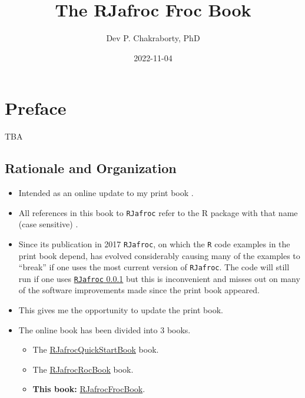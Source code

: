 \documentclass[
]{book}
\title{The RJafroc Froc Book}
\author{Dev P. Chakraborty, PhD}
\date{2022-11-04}
\providecommand{\tightlist}{%
  \setlength{\itemsep}{0pt}\setlength{\parskip}{0pt}}
\begin{document}
\maketitle

{
\setcounter{tocdepth}{1}
\tableofcontents
}
\hypertarget{preface}{%
\chapter*{Preface}\label{preface}}

TBA

\hypertarget{rationale-and-organization}{%
\section{Rationale and Organization}\label{rationale-and-organization}}

\begin{itemize}
\tightlist
\item
  Intended as an online update to my print book \citep{chakraborty2017observer}.
\item
  All references in this book to \texttt{RJafroc} refer to the R package with that name (case sensitive) \citep{R-RJafroc}.
\item
  Since its publication in 2017 \texttt{RJafroc}, on which the \texttt{R} code examples in the print book depend, has evolved considerably causing many of the examples to ``break'' if one uses the most current version of \texttt{RJafroc}. The code will still run if one uses \href{https://cran.r-project.org/src/contrib/Archive/RJafroc/}{\texttt{RJafroc} 0.0.1} but this is inconvenient and misses out on many of the software improvements made since the print book appeared.
\item
  This gives me the opportunity to update the print book.
\item
  The online book has been divided into 3 books.

  \begin{itemize}
  \tightlist
  \item
    The \href{https://dpc10ster.github.io/RJafrocQuickStart/}{RJafrocQuickStartBook} book.
  \item
    The \href{https://dpc10ster.github.io/RJafrocRocBook/}{RJafrocRocBook} book.
  \item
    \textbf{This book:} \href{https://dpc10ster.github.io/RJafrocFrocBook/}{RJafrocFrocBook}.
  \end{itemize}
\end{itemize}
\end{document}
